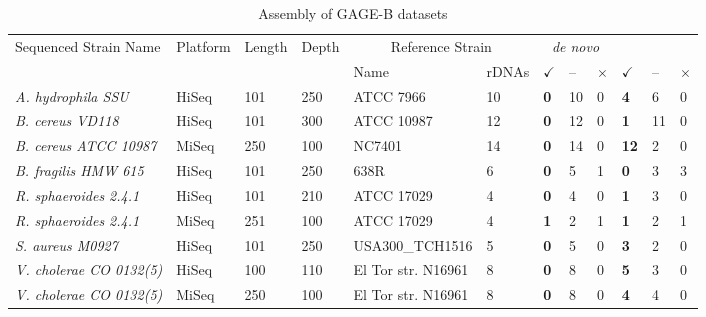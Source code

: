 \documentclass[a4,center,fleqn]{NAR}
\begin{document}
\begin{table*}[]
  \centering
  \caption{Assembly of GAGE-B datasets}
  \label{table:gageb}
  \begin{tabular}{p{5.2cm}p{.95cm}p{.75cm}p{.75cm}p{2.63cm}p{.6cm}>{\hfill}p{.4cm}p{.2cm}p{.1cm}>{\hfill}p{.4cm}p{.2cm}p{.1cm}}
    \toprule
    \multirow{2}{*}{Sequenced Strain Name} & \multirow{2}{*}{Platform}  & \multirow{2}{*}{Length} & \multirow{2}{*}{Depth}  &  \multicolumn{2}{c}{Reference Strain} &  \multicolumn{3}{c}{\textit{de novo}} & \multicolumn{3}{c}{\textit{de fere novo}} \\
   & & & & Name & rDNAs & \textbf{$\checkmark$} & -- & $\times$ & \textbf{$\checkmark$} & -- & $\times$  \\
    \colrule
    \textit{A. hydrophila SSU}   & HiSeq   & 101   & 250   & ATCC 7966 & 10 & \textbf{0} & 10 & 0  & \textbf{4} & 6 & 0  \\

    \textit{B. cereus VD118}    & HiSeq   & 101   & 300  & ATCC 10987  & 12 & \textbf{0} & 12 & 0  & \textbf{1} & 11 & 0  \\

    \textit{B. cereus ATCC 10987}   & MiSeq   & 250   & 100  & NC7401 & 14 & \textbf{0} & 14 & 0  & \textbf{12} & 2 & 0  \\

    \textit{B. fragilis HMW 615}   & HiSeq   & 101   & 250   & 638R & 6 & \textbf{0} & 5 & 1  & \textbf{0} & 3 & 3  \\

    \textit{R. sphaeroides 2.4.1} & HiSeq & 101 & 210 & ATCC 17029  & 4 & \textbf{0} & 4 & 0  & \textbf{1} & 3 & 0  \\

    \textit{R. sphaeroides 2.4.1} & MiSeq & 251 & 100 & ATCC 17029  & 4 & \textbf{1} & 2 & 1  & \textbf{1} & 2 & 1  \\

    \textit{S. aureus M0927} & HiSeq & 101 & 250 & USA300\_TCH1516 & 5 & \textbf{0} & 5 & 0  & \textbf{3} & 2 & 0  \\

    \textit{V. cholerae CO 0132(5)} & HiSeq & 100 & 110 & El Tor str. N16961  & 8 & \textbf{0} & 8 & 0  & \textbf{5} & 3 & 0  \\

    \textit{V. cholerae CO 0132(5)} & MiSeq   & 250   & 100   & El Tor str. N16961 & 8 & \textbf{0} & 8 & 0  & \textbf{4} & 4 & 0  \\


\end{tabular}
\end{table*}
\end{document}
